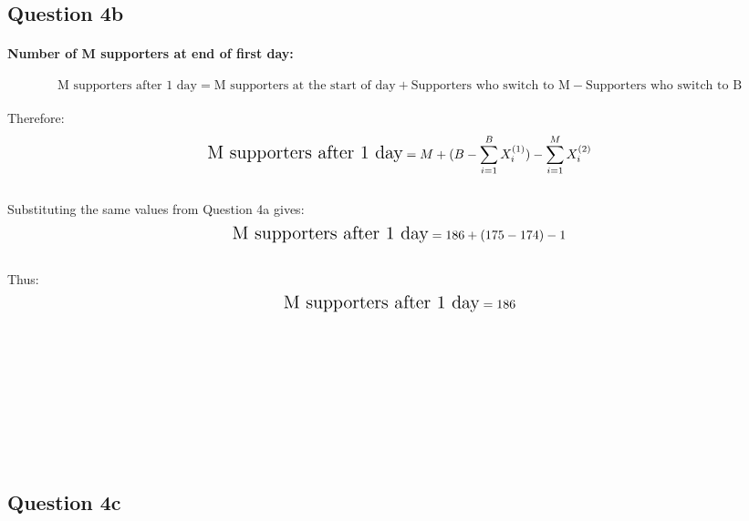 \documentclass[
]{article}
\begin{document}
\subsection{Question 4b}\label{question-4b}

\paragraph{Number of M supporters at end of first
day:}\label{number-of-m-supporters-at-end-of-first-day}

\[
\text{M supporters after 1 day} =\text{M  supporters at the start of day} + \text{Supporters who switch to M} - \text{Supporters who switch to B}
\]\\

Therefore:\\
\[
\Large
\text{M supporters after 1 day} = M +  (B-\sum_{i=1}^{B} X_i^{(1)}) -  \sum_{i=1}^{M}X_i^{(2)}
\]\\

Substituting the same values from Question 4a gives:\\

\[
\Large
\text{M supporters after 1 day} = 186 +  (175-174) - 1 
\]\\

Thus:\\
\[
\Large
\text{M supporters after 1 day} = 186
\]\\
\strut \\
\strut \\
\strut \\
\strut \\

\subsection{Question 4c}\label{question-4c}
\end{document}
